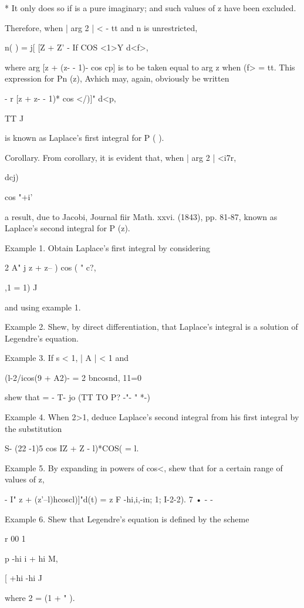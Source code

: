 {{* It only does so if is a pure imaginary; and such values of z have
been excluded.

%
%

Therefore, when | arg 2 | < - tt and n is unrestricted,

 n( ) = j[ [Z + Z' - If COS <1>Y d<f>,

where arg [z + (z- - 1)- cos cp] is to be taken equal to arg z when
(f> = tt. This expression for Pn (z), Avhich may, again, obviously be
written

- r [z + z- - 1)* cos </)]" d<p,

TT J

is known as Laplace's first integral for P ( ).

Corollary. From corollary, it is evident that, when | arg 2 |
<i7r,

dcj)

 cos "+i'

a result, due to Jacobi, Journal fiir Math. xxvi. (1843), pp. 81-87,
known as Laplace's second integral for P (z).

Example 1. Obtain Laplace's first integral by considering

2 A" j z + z-- ) cos ( " c?,

,1 = 1) J

and using example 1.

Example 2. Shew, by direct differentiation, that Laplace's integral is
a solution of Legendre's equation.

Example 3. If s < 1, | A | < 1 and

(l-2/icos(9 + A2)- = 2 bncosnd, 11=0

shew that = - T- jo (TT TO P? -"- " *-)

Example 4. When 2>1, deduce Laplace's second integral from his first
integral by the substitution

 S- (22 -1)5 cos IZ + Z - l)*COS( = l.

Example 5. By expanding in powers of cos<, shew that for a certain
range of values of z,

- I" z + (z'--l)hcoscl)]"d(t) = z F -hi,i,-in; 1; I-2-2). 7 • - -

Example 6. Shew that Legendre's equation is defined by the scheme

r 00 1

p -hi i + hi M,

[ +hi -hi J

where 2 = (1 + " ).

}}
